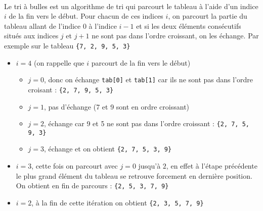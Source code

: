 \documentclass[11pt,a4paper]{article}
\begin{document}
\begin{Exercise}[title = {tri à bulles}] \\
	Le tri à bulles est un algorithme de tri qui parcourt le tableau à l'aide d'un indice $i$ de la fin vers le début. Pour chacun de ces indices $i$, on parcourt la partie du tableau allant de l'indice 0 à l'indice $i-1$ et si les deux éléments consécutifs situés aux indices $j$ et $j+1$ ne sont pas dans l'ordre croissant, on les échange. Par exemple sur le tableau {\tt \{7, 2, 9, 5, 3\}}
	\begin{itemize}
		\item[\textbullet] $i = 4$ (on rappelle que $i$ parcourt de la fin vers le début)
			\begin{itemize}
				\item $j=0$, donc on échange {\tt tab[0]} et {\tt tab[1]} car ils ne sont pas dans l'ordre croisant  : {\tt \{2, 7, 9, 5, 3\}}
				\item $j=1$, pas d'échange (7 et 9 sont en ordre croissant)
				\item $j=2$, échange car 9 et 5 ne sont pas dans l'ordre croissant : {\tt \{2, 7, 5, 9, 3\}}
				\item $j=3$, échange et on obtient {\tt \{2, 7, 5, 3, 9\}}
			\end{itemize}
		\item[\textbullet] $i=3$, cette fois on parcourt avec $j=0$ jusqu'à $2$, en effet à l'étape précédente le plus grand élément du tableau se retrouve forcement en dernière position. On obtient en fin de parcours : {\tt \{2, 5, 3, 7, 9\}}
		\item[\textbullet] $i=2$, à la fin de cette itération on obtient {\tt \{2, 3, 5, 7, 9\}}
	\end{itemize}


\end{Exercise}
\end{document}
